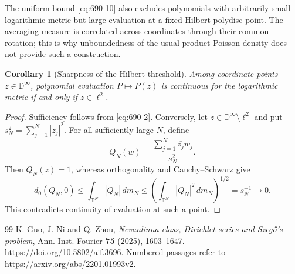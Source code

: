 \documentclass[11pt,a4paper]{article}
\newtheorem{corollary}[theorem]{Corollary}
\theoremstyle{remark}
\begin{document}
The uniform bound \eqref{eq:690-10} also excludes polynomials with arbitrarily
small logarithmic metric but large evaluation at a fixed Hilbert-polydisc
point.  The averaging measure is correlated across coordinates through
their common rotation; this is why unboundedness of the usual product
Poisson density does not provide such a construction.

\begin{corollary}[Sharpness of the Hilbert threshold]
Among coordinate points $z\in\mathbb D^\infty$, polynomial evaluation
$P\mapsto P(z)$ is continuous for the logarithmic metric if and only
if $z\in\ell^2$.
\end{corollary}

\begin{proof}
Sufficiency follows from \eqref{eq:690-2}.  Conversely, let
$z\in\mathbb D^\infty\setminus\ell^2$ and put
$s_N^2=\sum_{j=1}^N|z_j|^2$.  For all sufficiently large $N$, define
\[
 Q_N(w)=\frac{\sum_{j=1}^N\overline{z_j}w_j}{s_N^2}.
\]
Then $Q_N(z)=1$, whereas orthogonality and Cauchy--Schwarz give
\[
 d_0(Q_N,0)\le\int_{\mathbb T^N}|Q_N|\,dm_N
 \le\left(\int_{\mathbb T^N}|Q_N|^2\,dm_N\right)^{1/2}
 =s_N^{-1}\longrightarrow0.
\]
This contradicts continuity of evaluation at such a point.
\end{proof}

\begingroup\small
\begin{thebibliography}{99}
 K. Guo, J. Ni and Q. Zhou, \emph{Nevanlinna class, Dirichlet series and Szeg\H{o}'s problem}, Ann. Inst. Fourier \textbf{75} (2025), 1603--1647. \url{https://doi.org/10.5802/aif.3696}. Numbered passages refer to \url{https://arxiv.org/abs/2201.01993v2}.
\end{thebibliography}
\endgroup
\end{document}
